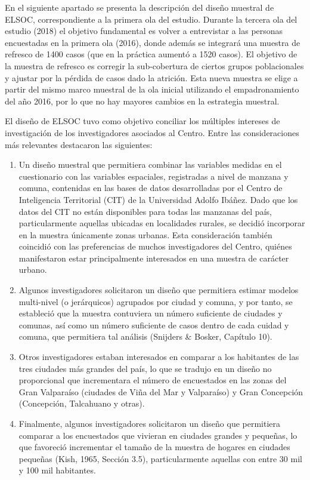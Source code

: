 \documentclass[
  openany]{book}
\begin{document}
En el siguiente apartado se presenta la descripción del diseño muestral de ELSOC, correspondiente a la primera ola del estudio. Durante la tercera ola del estudio (2018) el objetivo fundamental es volver a entrevistar a las personas encuestadas en la primera ola (2016), donde además se integrará una muestra de refresco de 1400 casos (que en la práctica aumentó a 1520 casos). El objetivo de la muestra de refresco es corregir la sub-cobertura de ciertos grupos poblacionales y ajustar por la pérdida de casos dado la atrición. Esta nueva muestra se elige a partir del mismo marco muestral de la ola inicial utilizando el empadronamiento del año 2016, por lo que no hay mayores cambios en la estrategia muestral.

El diseño de ELSOC tuvo como objetivo conciliar los múltiples intereses de investigación de los investigadores asociados al Centro. Entre las consideraciones más relevantes destacaron las siguientes:

\begin{enumerate}
\def\labelenumi{\arabic{enumi}.}
\item
  Un diseño muestral que permitiera combinar las variables medidas en el cuestionario con las variables espaciales, registradas a nivel de manzana y comuna, contenidas en las bases de datos desarrolladas por el Centro de Inteligencia Territorial (CIT) de la Universidad Adolfo Ibáñez. Dado que los datos del CIT no están disponibles para todas las manzanas del país, particularmente aquellas ubicadas en localidades rurales, se decidió incorporar en la muestra únicamente zonas urbanas. Esta consideración también coincidió con las preferencias de muchos investigadores del Centro, quiénes manifestaron estar principalmente interesados en una muestra de carácter urbano.
\item
  Algunos investigadores solicitaron un diseño que permitiera estimar modelos multi-nivel (o jerárquicos) agrupados por ciudad y comuna, y por tanto, se estableció que la muestra contuviera un número suficiente de ciudades y comunas, así como un número suficiente de casos dentro de cada cuidad y comuna, que permitiera tal análisis (Snijders \& Bosker, Capítulo 10).
\item
  Otros investigadores estaban interesados en comparar a los habitantes de las tres ciudades más grandes del país, lo que se tradujo en un diseño no proporcional que incrementara el número de encuestados en las zonas del Gran Valparaíso (ciudades de Viña del Mar y Valparaíso) y Gran Concepción (Concepción, Talcahuano y otras).
\item
  Finalmente, algunos investigadores solicitaron un diseño que permitiera comparar a los encuestados que vivieran en ciudades grandes y pequeñas, lo que favoreció incrementar el tamaño de la muestra de hogares en ciudades pequeñas (Kish, 1965, Sección 3.5), particularmente aquellas con entre 30 mil y 100 mil habitantes.
\end{enumerate}
\end{document}
